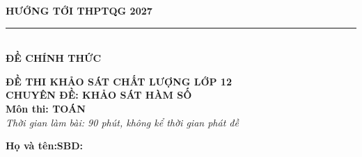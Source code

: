 \documentclass[12pt,a4paper]{article}
\begin{document}
\begin{minipage}[t]{0.40\textwidth}\centering
\textbf{HƯỚNG TỚI THPTQG 2027}\\[-2pt]
\rule{3.2cm}{0.6pt}\\[4pt]\textbf{ĐỀ CHÍNH THỨC}
\end{minipage}\hfill
\begin{minipage}[t]{0.58\textwidth}\centering
\textbf{ĐỀ THI KHẢO SÁT CHẤT LƯỢNG LỚP 12}\\
\textbf{CHUYÊN ĐỀ: KHẢO SÁT HÀM SỐ}\\\textbf{Môn thi: TOÁN}\\
\textit{\small Thời gian làm bài: 90 phút, không kể thời gian phát đề}
\end{minipage}
\vspace{0.2cm}

\noindent
\begin{minipage}[b]{0.78\textwidth}
\textbf{Họ và tên:}\dotfill\textbf{SBD:}\makebox[3.5cm]{\dotfill}
\end{minipage}\hfill
\begin{minipage}[b]{0.20\textwidth}\hfill
\setlength{\fboxrule}{0.8pt}%
\end{minipage}
\vspace{0.2cm}
\end{document}
